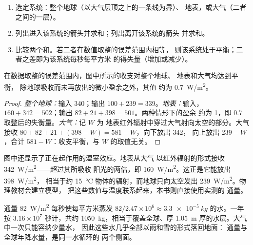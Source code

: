 \begin{method}[读懂能量收支图]\label{met:g10:earth-energy-budget:reading}
\begin{enumerate}
  \item 选定系统：整个地球（以大气层顶之上的一条线为界）、
        地表，或大气（二者之间的一层）。
  \item 列出进入该系统的箭头并求和；列出离开该系统的箭头
        并求和。
  \item 比较两个和。若二者在数值取整的误差范围内相等，
        则该系统处于平衡；二者之差即为该系统每秒每平方米
        的得失量（增加或减少）。
\end{enumerate}
\end{method}

\begin{proposition}[收支平衡]\label{prop:g10:earth-energy-budget:balance}
在数据取整的误差范围内，图中所示的收支对整个地球、
地表和大气均达到平衡，
除地球吸收而未再放出的微小盈余之外，其值
约为 \qty{0.7}{W/m^2}。
\end{proposition}

\begin{proof}
\emph{整个地球：}输入 340；输出 $100 + 239 = 339$。\emph{地表：}输入，
$160 + 342 = 502$；输出 $82 + 21 + 398 = 501$。两种情形下的盈余
约为 1，即 0.7 取整后的失衡量。\emph{大气：}记 $W$ 为
地表红外辐射中穿过大气射向太空的部分。大气
接收 $80 + 82 + 21 + (398 - W) = 581 - W$，向下放出 $342$，
向上放出 $239 - W$，合计 $581 - W$：收支平衡，与 $W$ 的取值无关。
\end{proof}

图中还显示了正在起作用的温室效应。地表从大气
以红外辐射的形式接收 \qty{342}{W/m^2}——超过其所吸收
阳光的两倍，即 \qty{160}{W/m^2}。这正是它能放出 \qty{398}{W/m^2}，
相当于约 \qty{15}{\degreeCelsius} 物体的辐射，而地球只向太空发出
\qty{239}{W/m^2}。物理教材会建立模型，
把这些数值与温度联系起来，本书则直接使用实测的
通量。

\begin{example}[每年一米水层]\label{ex:g10:earth-energy-budget:evaporation}
通量 \qty{82}{W/m^2} 每秒使每平方米蒸发 $82/2.47\times
10^6 \approx \qty{3.3e-5}{kg}$ 的水。一年按
$3.16\times10^7$ 秒计，共约 \qty{1050}{kg}，相当于覆盖全球、厚
\qty{1.05}{m} 厚的水层。大气中一次只能容纳少量水，
因此这些水几乎全部以雨和雪的形式落回地面：
通量与全球年降水量，是同一水循环的
两个侧面。
\end{example}

